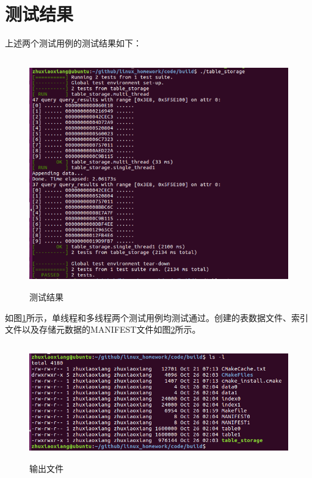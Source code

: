 \documentclass[bachelor]{thesis-uestc}
\begin{document}
\section{测试结果}
上述两个测试用例的测试结果如下：
\begin{figure}[htbp]
	\centering\includegraphics[height=10cm]{images/test_linux.png}
	\caption{测试结果}
	\label{fig:test_linux}
\end{figure}

如图\ref{fig:test_linux}所示，单线程和多线程两个测试用例均测试通过。创建的表数据文件、索引文件以及存储元数据的MANIFEST文件如图\ref{fig:test_linux_files}所示。
\begin{figure}[htbp]
	\centering\includegraphics[height=5cm]{images/test_linux_files.png}
	\caption{输出文件}
	\label{fig:test_linux_files}
\end{figure}
\end{document}

